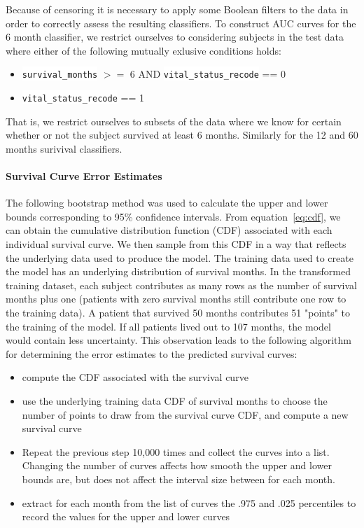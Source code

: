 \documentclass[10pt,letterpaper]{article}
\newcommand{\codewhite}[1]{\colorbox{white}{\texttt{#1}}}
\begin{document}
Because of censoring it is necessary to apply some Boolean filters to the data in order to correctly assess the resulting classifiers.
To construct AUC curves for the 6 month classifier, we restrict ourselves to considering
subjects in the test data where either of the following mutually exlusive conditions holds:

\begin{itemize}[noitemsep]
\item \codewhite{survival\_months} $>=$ 6 AND \codewhite{vital\_status\_recode} == 0
\item \codewhite{vital\_status\_recode} == 1
\end{itemize}




That is, we restrict ourselves to subsets of the data where we know for certain whether or not the subject survived at least 6 months. Similarly for the 12 and 60 months surivival classifiers. 

\paragraph{Survival Curve Error Estimates}
The following bootstrap method was used to calculate the upper and lower bounds corresponding to 95\% confidence intervals.
From equation~\ref{eq:cdf}, we can obtain the cumulative distribution function (CDF) associated with each individual survival curve.
We then sample from this CDF in a way that reflects the underlying data used to produce the model. The training data used to create the model has an underlying distribution of survival months. In the transformed training dataset, each subject contributes as many rows as the number of survival months plus one (patients with zero survival months still contribute one row to the training data). A patient that survived 50 months contributes 51 "points" to the training of the model. If all patients lived out to 107 months, the model would contain less uncertainty. This observation leads to the following algorithm for determining the error estimates to the predicted survival curves:

\begin{itemize}[noitemsep]
\item compute the CDF associated with the survival curve
\item use the underlying training data CDF of survival months to choose the number of points
to draw from the survival curve CDF, and compute a new survival curve 
\item Repeat the previous step 10,000 times and collect the curves into a list. Changing the number of curves affects how smooth the upper and lower bounds are, but does not affect the interval size between for each month.
\item extract for each month from the list of curves the .975 and .025 percentiles to record the values for the upper and lower curves
\end{itemize}
\end{document}
